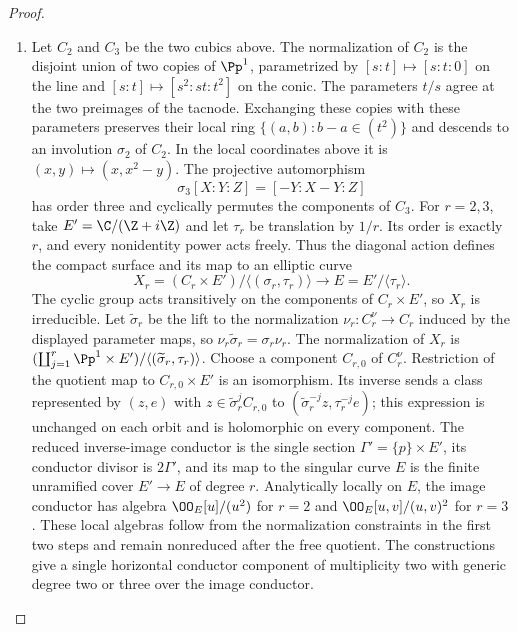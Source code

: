 \begin{proof}
\begin{enumerate}[leftmargin=*]
\item Let $C_2$ and $C_3$ be the two cubics above. The normalization
of $C_2$ is the disjoint union of two copies of $\Pp^1$, parametrized
by $[s:t]\mapsto[s:t:0]$ on the line and
$[s:t]\mapsto[s^2:st:t^2]$ on the conic. The parameters $t/s$ agree
at the two preimages of the tacnode. Exchanging these copies with
these parameters preserves their local ring
$\{(a,b):b-a\in(t^2)\}$ and descends to an involution $\sigma_2$
of $C_2$. In the local coordinates above it is
$(x,y)\mapsto(x,x^2-y)$. The projective automorphism
\[
 \sigma_3[X:Y:Z]=[-Y:X-Y:Z]
\]
has order three and cyclically permutes the components of $C_3$.
For $r=2,3$, take $E'=\C/(\Z+i\Z)$ and let $\tau_r$ be
translation by $1/r$. Its order is exactly $r$, and every nonidentity
power acts freely. Thus the diagonal action defines the compact
surface and its map to an elliptic curve
\[
 X_r=(C_r\times E')/\langle(\sigma_r,\tau_r)\rangle
       \longrightarrow E=E'/\langle\tau_r\rangle.
\]
The cyclic group acts transitively on the components of
$C_r\times E'$, so $X_r$ is irreducible. Let $\widetilde\sigma_r$
be the lift to the normalization $\nu_r:C_r^\nu\to C_r$ induced
by the displayed parameter maps, so
$\nu_r\widetilde\sigma_r=\sigma_r\nu_r$. The normalization of $X_r$ is
$(\coprod_{j=1}^r\Pp^1\times E')/\langle(\widetilde\sigma_r,\tau_r)\rangle$.
Choose a component $C_{r,0}$ of $C_r^\nu$. Restriction of the quotient
map to $C_{r,0}\times E'$ is an isomorphism. Its inverse sends a class
represented by $(z,e)$ with $z\in\widetilde\sigma_r^j C_{r,0}$ to
$(\widetilde\sigma_r^{-j}z,\tau_r^{-j}e)$; this expression is unchanged
on each orbit and is holomorphic on every component.
The reduced inverse-image conductor is the single section
$\Gamma'=\{p\}\times E'$, its conductor divisor is $2\Gamma'$, and
its map to the singular curve $E$ is the finite unramified cover
$E'\to E$ of degree $r$. Analytically locally on $E$, the image
conductor has algebra $\OO_E[u]/(u^2)$ for $r=2$ and
$\OO_E[u,v]/(u,v)^2$ for $r=3$. These local algebras follow from
the normalization constraints in the first two steps and remain
nonreduced after the free quotient. The constructions give a single
horizontal conductor component of multiplicity two with generic
degree two or three over the image conductor.

\end{enumerate}
\end{proof}